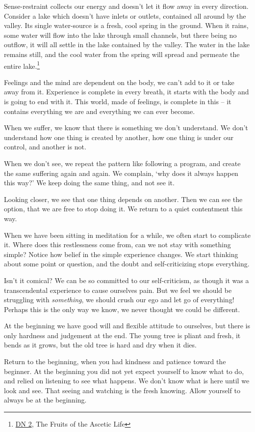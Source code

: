 \enlargethispage*{3\baselineskip}

Sense-restraint collects our energy and doesn't let it flow away in
every direction. Consider a lake which doesn't have inlets or outlets,
contained all around by the valley. Its single water-source is a fresh,
cool spring in the ground. When it rains, some water will flow into the
lake through small channels, but there being no outflow, it will all
settle in the lake contained by the valley. The water in the lake
remains still, and the cool water from the spring will spread and
permeate the entire lake.\footnote{\href{https://suttacentral.net/dn2}{DN
  2}, The Fruits of the Ascetic Life}

Feelings and the mind are dependent on the body, we can't add to it or
take away from it. Experience is complete in every breath, it starts
with the body and is going to end with it. This world, made of feelings,
is complete in this -- it contains everything we are and everything we
can ever become.


When we suffer, we know that there is something we don't understand. We
don't understand how one thing is created by another, how one thing is
under our control, and another is not.

When we don't see, we repeat the pattern like following a program, and
create the same suffering again and again. We complain, `why does it
always happen this way?' We keep doing the same thing, and not see it.

Looking closer, we see that one thing depends on another. Then we can
see the option, that we are free to stop doing it. We return to a quiet
contentment this way.


When we have been sitting in meditation for a while, we often start to
complicate it. Where does this restlessness come from, can we not stay
with something simple? Notice how belief in the simple experience
changes. We start thinking about some point or question, and the doubt
and self-criticizing stops everything.

Isn't it comical? We can be so committed to our self-criticism, as
though it was a transcendental experience to cause ourselves pain. But
we feel we should be struggling with \emph{something}, we should crush
our ego and let go of everything! Perhaps this is the only way we know,
we never thought we could be different.

At the beginning we have good will and flexible attitude to ourselves,
but there is only hardness and judgement at the end. The young tree is
pliant and fresh, it bends as it grows, but the old tree is hard and dry
when it dies.

Return to the beginning, when you had kindness and patience toward the
beginner. At the beginning you did not yet expect yourself to know what
to do, and relied on listening to see what happens. We don't know what
is here until we look and see. That seeing and watching is the fresh
knowing. Allow yourself to always be at the beginning.
